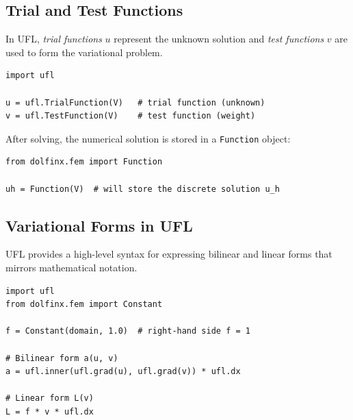 \documentclass[11pt]{article}
\begin{document}
\subsection{Trial and Test Functions}

In UFL, \emph{trial functions} $u$ represent the unknown solution and
\emph{test functions} $v$ are used to form the variational problem.

\begin{lstlisting}[style=python, caption={Defining trial and test functions.}]
import ufl

u = ufl.TrialFunction(V)   # trial function (unknown)
v = ufl.TestFunction(V)    # test function (weight)
\end{lstlisting}

After solving, the numerical solution is stored in a \texttt{Function} object:
\begin{lstlisting}[style=python, caption={Creating a Function to hold the solution.}]
from dolfinx.fem import Function

uh = Function(V)  # will store the discrete solution u_h
\end{lstlisting}

\subsection{Variational Forms in UFL}

UFL provides a high-level syntax for expressing bilinear and linear forms
that mirrors mathematical notation.

\begin{lstlisting}[style=python, caption={Expressing the Poisson variational form in UFL.}]
import ufl
from dolfinx.fem import Constant

f = Constant(domain, 1.0)  # right-hand side f = 1

# Bilinear form a(u, v)
a = ufl.inner(ufl.grad(u), ufl.grad(v)) * ufl.dx

# Linear form L(v)
L = f * v * ufl.dx
\end{lstlisting}
\end{document}
